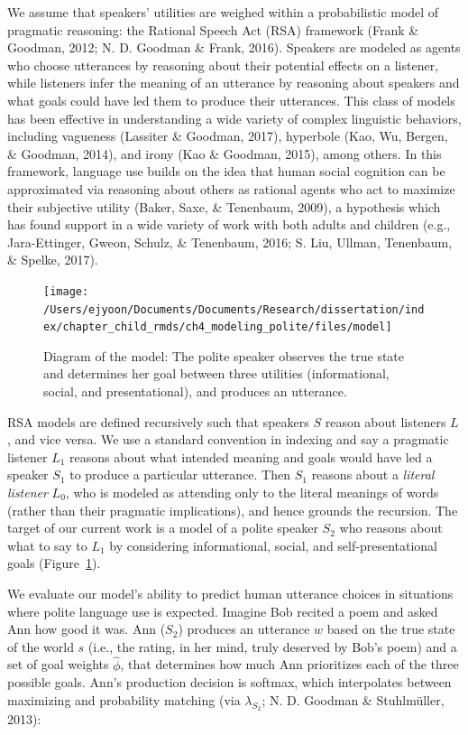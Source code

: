 \documentclass[oneside]{report}
\begin{document}
We assume that speakers' utilities are weighed within a probabilistic
model of pragmatic reasoning: the Rational Speech Act (RSA) framework
(Frank \& Goodman, 2012; N. D. Goodman \& Frank, 2016). Speakers are
modeled as agents who choose utterances by reasoning about their
potential effects on a listener, while listeners infer the meaning of an
utterance by reasoning about speakers and what goals could have led them
to produce their utterances. This class of models has been effective in
understanding a wide variety of complex linguistic behaviors, including
vagueness (Lassiter \& Goodman, 2017), hyperbole (Kao, Wu, Bergen, \&
Goodman, 2014), and irony (Kao \& Goodman, 2015), among others. In this
framework, language use builds on the idea that human social cognition
can be approximated via reasoning about others as rational agents who
act to maximize their subjective utility (Baker, Saxe, \& Tenenbaum,
2009), a hypothesis which has found support in a wide variety of work
with both adults and children (e.g., Jara-Ettinger, Gweon, Schulz, \&
Tenenbaum, 2016; S. Liu, Ullman, Tenenbaum, \& Spelke, 2017).
\begin{figure}[!t]

{\centering \texttt{[image: /Users/ejyoon/Documents/Documents/Research/dissertation/index/chapter\_child\_rmds/ch4\_modeling\_polite/files/model]} 

}

\caption[Graphical representation of the computational model of polite speech production and understanding.]{Diagram of the model: The polite speaker observes the true state and determines her goal between three utilities (informational, social, and presentational), and produces an utterance.}\label{fig:model}
\end{figure}
RSA models are defined recursively such that speakers \(S\) reason about
listeners \(L\), and vice versa. We use a standard convention in
indexing and say a pragmatic listener \(L_1\) reasons about what
intended meaning and goals would have led a speaker \(S_1\) to produce a
particular utterance. Then \(S_1\) reasons about a \emph{literal
listener} \(L_0\), who is modeled as attending only to the literal
meanings of words (rather than their pragmatic implications), and hence
grounds the recursion. The target of our current work is a model of a
polite speaker \(S_2\) who reasons about what to say to \(L_1\) by
considering informational, social, and self-presentational goals
(Figure~\ref{fig:model}).

We evaluate our model's ability to predict human utterance choices in
situations where polite language use is expected. Imagine Bob recited a
poem and asked Ann how good it was. Ann (\(S_2\)) produces an utterance
\(w\) based on the true state of the world \(s\) (i.e., the rating, in
her mind, truly deserved by Bob's poem) and a set of goal weights
\(\hat{\phi}\), that determines how much Ann prioritizes each of the
three possible goals. Ann's production decision is softmax, which
interpolates between maximizing and probability matching (via
\(\lambda_{S_2}\); N. D. Goodman \& Stuhlmüller, 2013):
\end{document}
